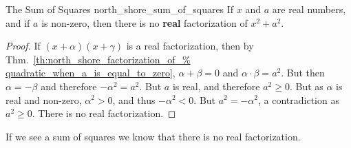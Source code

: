 \documentclass[crop=false,class=article,oneside]{standalone}
\begin{document}
        \begin{frametheorem}{The Sum of Squares}
                       {north_shore_sum_of_squares}
            If $x$ and $a$ are real numbers, and if
            $a$ is non-zero, then there is no \textbf{real}
            factorization of $x^{2}+a^{2}$.
        \end{frametheorem}
        \begin{proof}
            If $(x+\alpha)(x+\gamma)$ is a real factorization,
            then by Thm.~\ref{th:north_shore_factorization_of_%
                              quadratic_when_a_is_equal_to_zero},
            $\alpha+\beta=0$ and $\alpha\cdot\beta=a^{2}$. But then
            $\alpha=-\beta$ and therefore $-\alpha^{2}=a^{2}$. But
            $a$ is real, and therefore $a^{2}\geq 0$. But as
            $\alpha$ is real and non-zero, $\alpha^{2}>0$, and
            thus $-\alpha^{2}<0$. But $a^{2}=-\alpha^{2}$,
            a contradiction as $a^{2}\geq 0$. There is no real factorization.
        \end{proof}
        \begin{remark}
        If we see a sum of squares we know that there is no real factorization.
        \end{remark}
\end{document}
